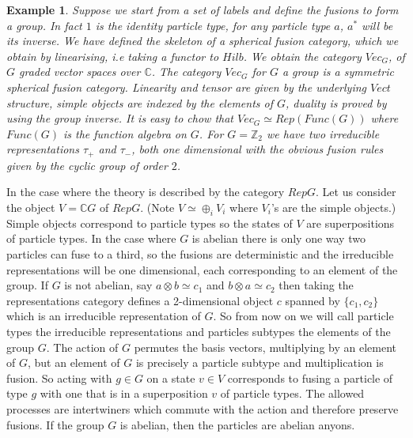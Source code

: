 \documentclass{article}
\newtheorem{example}{Example}
\newenvironment{remark}[1][Remark]{\begin{trivlist}
\item[\hskip \labelsep {\bfseries #1}]}{\end{trivlist}}
\begin{document}
\begin{example}
	Suppose we start from a set of labels and define the fusions to form a group. In fact $1$ is the identity particle type, for any particle type $a$, $a^*$ will be its inverse. We have defined the skeleton of a spherical fusion category, which we obtain by linearising, i.e taking a functor to $Hilb$. We obtain the category $Vec_G$, of $G$ graded vector spaces over $\mathbb{C}$.
	The category $Vec_G$ for $G$ a group is a symmetric spherical fusion category. Linearity and tensor are given by the underlying $Vect$ structure, simple objects are indexed by the elements of $G$, duality is proved by using the group inverse. It is easy to chow that $Vec_G \simeq Rep(Func(G))$ where $Func(G)$ is the function algebra on $G$.
	For $G=\mathbb{Z}_2$ we have two irreducible representations $\tau_+$ and $\tau_-$, both one dimensional with the obvious fusion rules given by the cyclic group of order $2$.\\
\end{example}

\begin{remark}
	In the case where the theory is described by the category $RepG$.
	Let us consider the object $V=\mathbb{C}G$ of $RepG$. (Note $V \simeq \oplus_i V_i$ where $V_i$'s are the simple objects.) Simple objects correspond to particle types so the states of $V$ are superpositions of particle types. In the case where $G$ is abelian there is only one way two particles can fuse to a third, so the fusions are deterministic and the irreducible representations will be one dimensional, each corresponding to an element of the group. If $G$ is not abelian, say $a\otimes b \simeq c_1$ and $b \otimes a \simeq c_2$ then taking the representations category defines a 2-dimensional object $c$ spanned by $\{c_1,c_2\}$ which is an irreducible representation of $G$. So from now on we will call particle types the irreducible representations and particles subtypes the elements of the group $G$.  The action of $G$ permutes the basis vectors, multiplying by an element of $G$, but an element of $G$ is precisely a particle subtype and multiplication is fusion. So acting with $g \in G$ on a state $v \in V$ corresponds to fusing a particle of type $g$ with one that is in a superposition $v$ of particle types. The allowed processes are intertwiners which commute with the action and therefore preserve fusions. If the group $G$ is abelian, then the particles are abelian anyons.
\end{remark}
\end{document}
